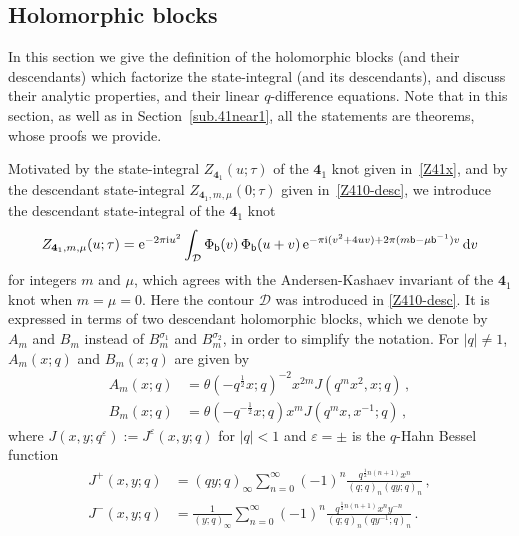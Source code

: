 \documentclass[12pt,reqno]{amsart}
\theoremstyle{definition}
\def\s{\sigma}
\def\th{\theta}
\def\ve{\varepsilon}
\def\bb{\mathsf{b}}
\def\ri{\mathrm{i}}
\def\rd{\mathrm{d}}
\def\re{{\rm e}}
\def\ri{{\rm i}}
\def\rd{{\rm d}}
\def\mc{\mathcal}
\def\md{\mathbf}
\newcommand{\knot}[1]{\md{#1}}
\begin{document}
\subsection{Holomorphic blocks}
\label{sub.41holo}


In this section we give the definition of the holomorphic blocks (and
their descendants) which factorize the state-integral (and its
descendants), and discuss their analytic properties, and their linear
$q$-difference equations.  Note that in this section, as well as in
Section~\ref{sub.41near1}, all the statements are theorems, whose
proofs we provide.

Motivated by the state-integral $Z_{\knot{4}_1}(u;\tau)$ of the
$\knot{4}_1$ knot given in~\eqref{Z41x}, and by the descendant
state-integral $Z_{\knot{4}_1,m,\mu}(0;\tau)$ given
in~\eqref{Z410-desc}, we introduce the descendant state-integral of
the $\knot{4}_1$ knot 
\begin{equation}
  \label{Z41x-desc}
  Z_{\knot{4}_1,m,\mu}(u;\tau) =
  \re^{-2 \pi \ri u^2} 
  \int_{\mc{D}} \Phi_\bb(v) \, \Phi_\bb(u+v)
  \, \re^{-\pi \ri (v^2+4uv) + 2\pi(m \bb - \mu \bb^{-1})v} \, \rd v
\end{equation}
for integers $m$ and $\mu$, which agrees with the Andersen-Kashaev
invariant of the $\knot{4}_1$ knot when $m=\mu=0$. Here the contour
$\mc{D}$ was introduced in \eqref{Z410-desc}. It is expressed in terms
of two descendant holomorphic blocks, which we denote by $A_m$ and
$B_m$ instead of $B^{\s_1}_m$ and $B^{\s_2}_m$, in order to simplify
the notation.  For $|q| \neq 1$, $A_m(x;q)$ and $B_m(x;q)$ are given
by
\begin{subequations}
  \begin{align}
    \label{41Am}
    A_m(x;q) &= \th(-q^{\frac{1}{2}}x;q)^{-2}
               x^{2m} J(q^m x^2, x; q)\,, \\
    \label{41Bm}
    B_m(x;q) &= \th(-q^{-\frac{1}{2}}x;q)
               x^m J(q^m x, x^{-1}; q)\,,
  \end{align}
\end{subequations}
where $J(x,y;q^\ve):=J^\ve(x,y;q)$ for $|q|<1$ and $\ve=\pm$ is the
$q$-Hahn Bessel function
\begin{subequations}
\begin{align}
  \label{J41p}
  J^+(x,y;q) & = (qy;q)_\infty \sum_{n=0}^\infty (-1)^n
               \frac{q^{\frac{1}{2}n(n+1)} x^n}{(q;q)_n (qy;q)_n}\,, \\
  \label{J41n}
  J^-(x,y;q) & = \frac{1}{(y;q)_\infty}
               \sum_{n=0}^\infty (-1)^n \frac{q^{\frac{1}{2}n(n+1)}
               x^n y^{-n}}{ (q;q)_n (qy^{-1};q)_n}
               \,.
\end{align}
\end{subequations}
\end{document}

